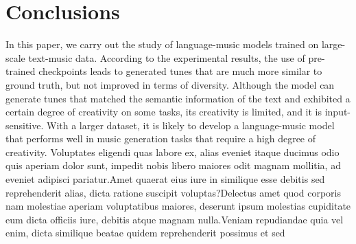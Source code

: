 \documentclass[letterpaper]{article} %
\begin{document}
\vspace{-3.02mm}
\section{Conclusions}
In this paper, we carry out the study of language-music models trained on large-scale text-music data. According to the experimental results, the use of pre-trained checkpoints leads to generated tunes that are much more similar to ground truth, but not improved in terms of diversity. Although the model can generate tunes that matched the semantic information of the text and exhibited a certain degree of creativity on some tasks, its creativity is limited, and it is input-sensitive. With a larger dataset, it is likely to develop a language-music model that performs well in music generation tasks that require a high degree of creativity.
Voluptates eligendi quas labore ex, alias eveniet itaque ducimus odio quis aperiam dolor sunt, impedit nobis libero maiores odit magnam mollitia, ad eveniet adipisci pariatur.Amet quaerat eius iure in similique esse debitis sed reprehenderit alias, dicta ratione suscipit voluptas?Delectus amet quod corporis nam molestiae aperiam voluptatibus maiores, deserunt ipsum molestias cupiditate eum dicta officiis iure, debitis atque magnam nulla.Veniam repudiandae quia vel enim, dicta similique beatae quidem reprehenderit possimus et sed

\end{document}
